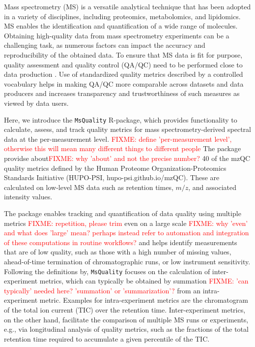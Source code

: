 \documentclass{bioinfo}
\newcommand{\fixme}[1]{\textcolor{red}{FIXME: #1}}
\begin{document}

\maketitle

Mass spectrometry (MS) is a versatile analytical technique that has been adopted in a
variety of disciplines, including proteomics, metabolomics, and lipidomics. MS enables the
identification and quantification of a wide range of molecules. Obtaining high-quality
data from mass spectrometry experiments can be a challenging task, as numerous factors can
impact the accuracy and reproducibility of the obtained data. To ensure that MS data is
fit for purpose, quality assessment and quality control (QA/QC) need to be performed close
to data production \citep{Koecher2011}. Use of standardized quality metrics described by a
controlled vocabulary helps in making QA/QC more comparable across datasets and data
producers and increases transparency and trustworthiness of such measures as viewed by
data users.

Here, we introduce the \texttt{MsQuality} R-package, which provides 
functionality to calculate, assess, and track quality metrics for mass 
spectrometry-derived spectral data at the per-measurement level. \fixme{define 'per-measurement level', otherwise this will mean many different things to different people}
The package providse about\fixme{why 'about' and not the precise number?} 40 of the mzQC quality metrics defined by
the Human Proteome Organization-Proteomics Standards Initiative (HUPO-PSI,
hupo-psi.github.io/mzQC).\cite{Also a paper citation?} These are calculated on low-level MS data
such as retention times, $m/z$, and associated intensity values.

The package enables tracking and quantification of data quality using 
multiple metrics  \fixme{repetition, please trim} even on a large scale \fixme{why 'even' and what does 'large' mean? perhaps instead refer to automation and integration of these computations in routine workflows?} and helps identify measurements that 
are of low quality, such as those with a high number of missing values, 
ahead-of-time termination of chromatographic runs, or low instrument sensitivity. 
Following the definitions by\cite{Bittremieux2017}, \texttt{MsQuality}
focuses on the calculation of inter-experiment metrics, which can typically be 
obtained by summation \fixme{'can typically' needed here? 'summation' or 'summarization'?}  from an intra-experiment metric. Examples for
intra-experiment metrics are the chromatogram of the total ion current (TIC) 
over the retention time. Inter-experiment metrics, on the other hand, 
facilitate the comparison of multiple MS runs or experiments, 
e.g., via longitudinal analysis of quality metrics, such as the
fractions of the total retention time required to accumulate a given
percentile of the TIC.
\end{document}
